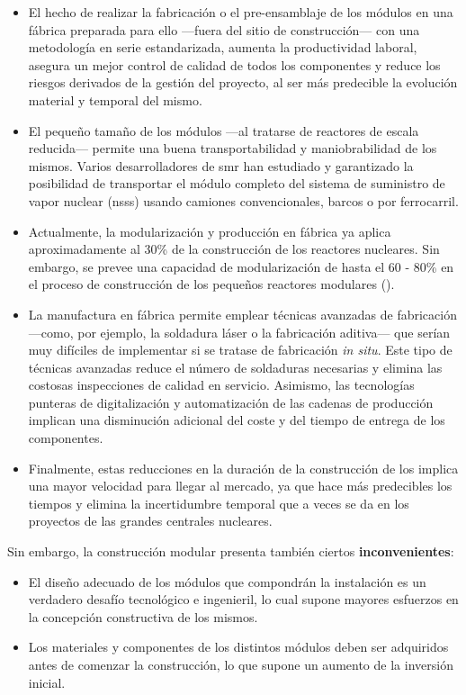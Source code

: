 \begin{itemize}
  \item El hecho de realizar la fabricación o el pre-ensamblaje de los módulos en una fábrica preparada para ello ---fuera del sitio de construcción--- con una metodología en serie estandarizada, aumenta la productividad laboral, asegura un mejor control de calidad de todos los componentes y reduce los riesgos derivados de la gestión del proyecto, al ser más predecible la evolución material y temporal del mismo.
  \item El pequeño tamaño de los módulos ---al tratarse de reactores de escala reducida--- permite una buena transportabilidad y maniobrabilidad de los mismos. Varios desarrolladores de \acrshort{smr} han estudiado y garantizado la posibilidad de transportar el módulo completo del sistema de suministro de vapor nuclear (\acrshort{nsss}) usando camiones convencionales, barcos o por ferrocarril.
  \item Actualmente, la modularización y producción en fábrica ya aplica aproximadamente al 30\% de la construcción de los reactores nucleares. Sin embargo, se prevee una capacidad de modularización de hasta el 60 - 80\% en el proceso de construcción de los pequeños reactores modulares (\cite{nea_unlocking_2020}).
  \item La manufactura en fábrica permite emplear técnicas avanzadas de fabricación ---como, por ejemplo, la soldadura láser o la fabricación aditiva--- que serían muy difíciles de implementar si se tratase de fabricación \emph{in situ}. Este tipo de técnicas avanzadas reduce el número de soldaduras necesarias y elimina las costosas inspecciones de calidad en servicio. Asimismo, las tecnologías punteras de digitalización y automatización de las cadenas de producción implican una disminución adicional del coste y del tiempo de entrega de los componentes.
  \item Finalmente, estas reducciones en la duración de la construcción de los  implica una mayor velocidad para llegar al mercado, ya que hace más predecibles los tiempos y elimina la incertidumbre temporal que a veces se da en los proyectos de las grandes centrales nucleares.
\end{itemize}

Sin embargo, la construcción modular presenta también ciertos \textbf{inconvenientes}:

\begin{itemize}
  \item El diseño adecuado de los módulos que compondrán la instalación es un verdadero desafío tecnológico e ingenieril, lo cual supone mayores esfuerzos en la concepción constructiva de los mismos.
  \item Los materiales y componentes de los distintos módulos deben ser adquiridos antes de comenzar la construcción, lo que supone un aumento de la inversión inicial.
\end{itemize}

